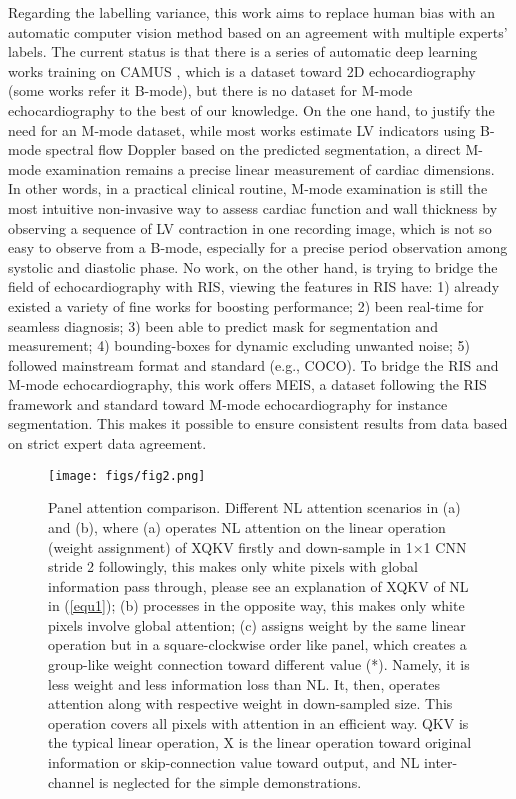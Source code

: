 \documentclass{article}
\begin{document}
Regarding the labelling variance, this work aims to replace human bias with an automatic computer vision method based on an agreement with multiple experts’ labels. The current status is that there is a series of automatic deep learning works \cite{leclerc2019ru}\cite{smistad2020real}\cite{pu2021fetal}\cite{saeed2022contrastive}\cite{painchaud2022echocardiography}\cite{girum2021learning} training on CAMUS \cite{leclerc2019deep}, which is a dataset toward 2D echocardiography (some works refer it B-mode), but there is no dataset for M-mode echocardiography to the best of our knowledge. On the one hand, to justify the need for an M-mode dataset, while most works estimate LV indicators using B-mode spectral flow Doppler based on the predicted segmentation, a direct M-mode examination remains a precise linear measurement of cardiac dimensions. In other words, in a practical clinical routine, M-mode examination is still the most intuitive non-invasive way to assess cardiac function and wall thickness \cite{otto2013textbook} by observing a sequence of LV contraction in one recording image, which is not so easy to observe from a B-mode, especially for a precise period observation among systolic and diastolic phase. No work, on the other hand, is trying to bridge the field of echocardiography with RIS, viewing the features in RIS have: 1) already existed a variety of fine works for boosting performance; 2) been real-time for seamless diagnosis; 3) been able to predict mask for segmentation and measurement; 4) bounding-boxes for dynamic excluding unwanted noise; 5) followed mainstream format and standard (e.g., COCO). To bridge the RIS and M-mode echocardiography, this work offers MEIS, a dataset following the RIS framework and standard toward M-mode echocardiography for instance segmentation. This makes it possible to ensure consistent results from data based on strict expert data agreement.

\begin{figure}[!t]
    \centering
    \texttt{[image: figs/fig2.png]}
    \caption{Panel attention comparison. Different NL attention scenarios in (a) and (b), where (a) operates NL attention on the linear operation (weight assignment) of XQKV firstly and down-sample in 1×1 CNN stride 2 followingly, this makes only white pixels with global information pass through, please see an explanation of XQKV of NL in (\ref{equ1}); (b) processes in the opposite way, this makes only white pixels involve global attention; (c) assigns weight by the same linear operation but in a square-clockwise order like panel, which creates a group-like weight connection toward different value (*). Namely, it is less weight and less information loss than NL. It, then, operates attention along with respective weight in down-sampled size. This operation covers all pixels with attention in an efficient way. QKV is the typical linear operation, X is the linear operation toward original information or skip-connection value toward output, and NL inter-channel is neglected for the simple demonstrations.}
    \label{fig2}
\end{figure}
\end{document}
